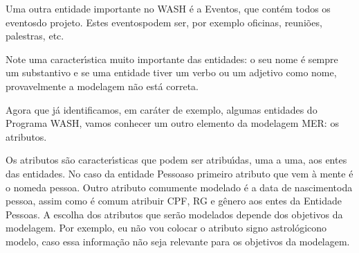\documentclass[
12pt,		%
openright,	%
twoside,  %
a4paper,			%
chapter=TITLE,		%
english,			%
french,				%
spanish,			%
brazil				%
]{USPSC-classe/USPSC}
\begin{document}
Uma outra entidade importante no WASH \'e a \textquotedbl Eventos\textquotedbl , que cont\'em todos os \textquotedbl eventos\textquotedbl  do projeto. Estes \textquotedbl eventos\textquotedbl  podem ser, por exemplo \textquotedbl oficinas\textquotedbl , \textquotedbl reuni\~oes\textquotedbl , \textquotedbl palestras\textquotedbl , etc.









Note uma caracter\'{\i}stica muito importante das entidades: o seu nome \'e sempre um substantivo e se uma entidade tiver um verbo ou um adjetivo como nome, provavelmente a modelagem n\~ao est\'a correta.










\noindent\begin{center}\mbox{\centering{}}\end{center}


Agora que j\'a identificamos, em car\'ater de exemplo, algumas entidades do Programa WASH, vamos conhecer um outro elemento da modelagem MER: os atributos.









Os atributos s\~ao caracter\'{\i}sticas que podem ser atribu\'{\i}das, uma a uma, aos entes das entidades. No caso da entidade \textquotedbl Pessoas\textquotedbl  o primeiro atributo que vem \`a mente \'e o \textquotedbl nome\textquotedbl  da pessoa. Outro atributo comumente modelado \'e a \textquotedbl data de nascimento\textquotedbl  da pessoa, assim como \'e comum atribuir CPF, RG e g\^enero aos entes da Entidade \textquotedbl Pessoas\textquotedbl . A escolha dos atributos que ser\~ao modelados depende dos objetivos da modelagem. Por exemplo, eu n\~ao vou colocar o atributo \textquotedbl signo astrol\'ogico\textquotedbl  no modelo, caso essa informa\c{c}\~ao n\~ao seja relevante para os objetivos da modelagem.
\end{document}
